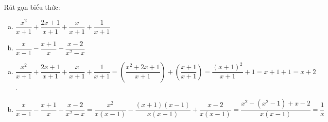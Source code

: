 \begin{ex}%
Rút gọn biểu thức:
\begin{multicols}{2}
\begin{enumerate}[a)]
\item $\dfrac{x^2}{x + 1} + \dfrac{2x + 1}{x + 1} + \dfrac{x}{x + 1} + \dfrac{1}{x + 1}$
\item $\dfrac{x}{x - 1} - \dfrac{x + 1}{x} + \dfrac{x - 2}{x^2 - x}$
\end{enumerate}
\end{multicols}
\loigiai
	{
	\begin{enumerate}[a)]
	\item $\dfrac{x^2}{x + 1} + \dfrac{2x + 1}{x + 1} + \dfrac{x}{x + 1} + \dfrac{1}{x + 1} = \left(\dfrac{x^2 + 2x + 1}{x + 1}\right) + \left( \dfrac{x + 1}{x + 1}  \right) = \dfrac{(x + 1)^2}{x + 1} + 1 = x + 1 + 1 = x + 2$.
	\item $\dfrac{x}{x - 1} - \dfrac{x + 1}{x} + \dfrac{x - 2}{x^2 - x} = \dfrac{x^2}{x(x - 1)} - \dfrac{(x + 1)(x - 1)}{x(x - 1)} + \dfrac{x - 2}{x(x - 1)} = \dfrac{x^2 - (x^2 - 1) + x - 2}{x(x - 1)} = \dfrac{1}{x}$
	\end{enumerate}
	}
\end{ex}

